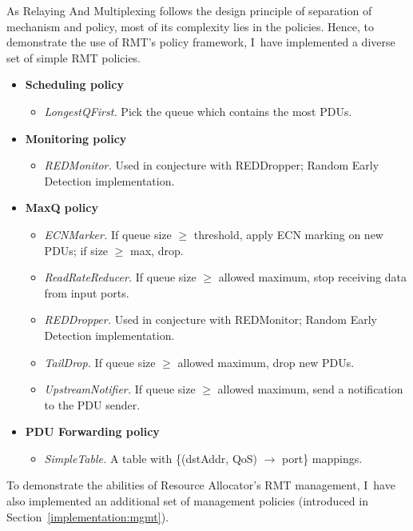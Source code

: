         As Relaying And Multiplexing follows the design principle of separation of mechanism and policy, most of its complexity lies in the policies. Hence, to demonstrate the use of RMT's policy framework, I~have implemented a diverse set of simple RMT policies.

        \begin{itemize}
            \item \textbf{Scheduling policy}
            \begin{itemize}
                \item \emph{LongestQFirst.} Pick the queue which contains the most PDUs.
            \end{itemize}
            \item \textbf{Monitoring policy}
            \begin{itemize}
                \item \emph{REDMonitor.} Used in conjecture with REDDropper; Random Early Detection implementation.
            \end{itemize}
            \item \textbf{MaxQ policy}
            \begin{itemize}
                \item \emph{ECNMarker.} If queue size $\geq$ threshold, apply ECN marking on new PDUs; if size $\geq$ max, drop.
                \item \emph{ReadRateReducer.} If queue size $\geq$ allowed maximum, stop receiving data from input ports.
                \item \emph{REDDropper.} Used in conjecture with REDMonitor; Random Early Detection implementation.
                \item \emph{TailDrop.} If queue size $\geq$ allowed maximum, drop new PDUs.
                \item \emph{UpstreamNotifier.} If queue size $\geq$ allowed maximum, send a notification to the PDU sender.
            \end{itemize}
            \item \textbf{PDU Forwarding policy}
            \begin{itemize}
                \item \emph{SimpleTable.} A table with \{(dstAddr, QoS) $\rightarrow$ port\} mappings.
            \end{itemize}
        \end{itemize}

        To demonstrate the abilities of Resource Allocator's RMT management, I~have also implemented an additional set of management policies (introduced in Section~\ref{implementation:mgmt}).


